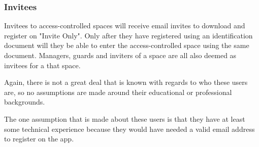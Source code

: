 \subsubsection{Invitees}
Invitees to access-controlled spaces will receive email invites to download and register on "Invite Only". Only after they have registered using an identification document will they be able to enter the access-controlled space using the same document. Managers, guards and inviters of a space are all also deemed as invitees for a that space. 

Again, there is not a great deal that is known with regards to who these users are, so no assumptions are made around their educational or professional backgrounds. 

The one assumption that is made about these users is that they have at least some technical experience because they would have needed a valid email address to register on the app.